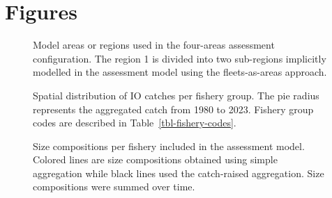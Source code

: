 \documentclass[
]{scrartcl}
\begin{document}
\newpage{}

\section{Figures}\label{figures}

\begin{figure}


\caption{\label{fig-4A-config}Model areas or regions used in the
four-areas assessment configuration. The region 1 is divided into two
sub-regions implicitly modelled in the assessment model using the
fleets-as-areas approach.}

\end{figure}%

\newpage{}

\begin{figure}


\caption{\label{fig-catch-grid}Spatial distribution of IO catches per
fishery group. The pie radius represents the aggregated catch from 1980
to 2023. Fishery group codes are described in
Table~\ref{tbl-fishery-codes}.}

\end{figure}%

\newpage{}

\begin{figure}


\caption{\label{fig-agg-size}Size compositions per fishery included in
the assessment model. Colored lines are size compositions obtained using
simple aggregation while black lines used the catch-raised aggregation.
Size compositions were summed over time.}

\end{figure}%

\newpage{}
\end{document}

